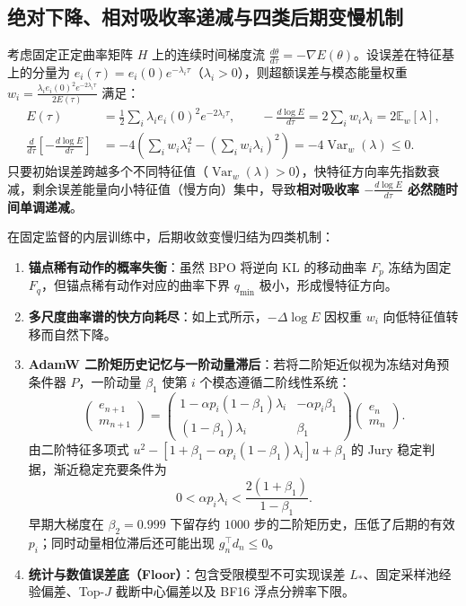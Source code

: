 \documentclass[lang=cn,scheme=chinese,openany]{elegantbook}
\newcommand{\E}{\mathbb E}
\newcommand{\Var}{\operatorname{Var}}
\begin{document}
\subsection{绝对下降、相对吸收率递减与四类后期变慢机制}

考虑固定正定曲率矩阵 $H$ 上的连续时间梯度流 $\frac{d\theta}{d\tau}=-\nabla E(\theta)$。设误差在特征基上的分量为 $e_i(\tau)=e_i(0)e^{-\lambda_i\tau}$（$\lambda_i>0$），则超额误差与模态能量权重 $w_i=\frac{\lambda_i e_i(0)^2 e^{-2\lambda_i\tau}}{2E(\tau)}$ 满足：
\begin{align}
E(\tau)&=\frac12\sum_i\lambda_i e_i(0)^2e^{-2\lambda_i\tau},\qquad
-\frac{d\log E}{d\tau}=2\sum_i w_i\lambda_i=2\E_w[\lambda],\\
\frac{d}{d\tau}\left[-\frac{d\log E}{d\tau}\right]
&=-4\left(\sum_i w_i\lambda_i^2-\left(\sum_i w_i\lambda_i\right)^2\right)
=-4\operatorname{Var}_w(\lambda)\le0.
\end{align}
只要初始误差跨越多个不同特征值（$\Var_w(\lambda)>0$），快特征方向率先指数衰减，剩余误差能量向小特征值（慢方向）集中，导致\textbf{相对吸收率 $-\frac{d\log E}{d\tau}$ 必然随时间单调递减}。

在固定监督的内层训练中，后期收敛变慢归结为四类机制：
\begin{enumerate}
\item \textbf{锚点稀有动作的概率失衡}：虽然 BPO 将逆向 KL 的移动曲率 $F_p$ 冻结为固定 $F_q$，但锚点稀有动作对应的曲率下界 $q_{\min}$ 极小，形成慢特征方向。
\item \textbf{多尺度曲率谱的快方向耗尽}：如上式所示，$-\Delta\log E$ 因权重 $w_i$ 向低特征值转移而自然下降。
\item \textbf{AdamW 二阶矩历史记忆与一阶动量滞后}：若将二阶矩近似视为冻结对角预条件器 $P$，一阶动量 $\beta_1$ 使第 $i$ 个模态遵循二阶线性系统：
\begin{equation}
\begin{pmatrix}e_{n+1}\\m_{n+1}\end{pmatrix}
=\begin{pmatrix}
1-\alpha p_i(1-\beta_1)\lambda_i&-\alpha p_i\beta_1\\
(1-\beta_1)\lambda_i&\beta_1
\end{pmatrix}
\begin{pmatrix}e_n\\m_n\end{pmatrix}.
\end{equation}
由二阶特征多项式 $u^2-[1+\beta_1-\alpha p_i(1-\beta_1)\lambda_i]u+\beta_1$ 的 Jury 稳定判据，渐近稳定充要条件为
\begin{equation*}
0<\alpha p_i\lambda_i<\frac{2(1+\beta_1)}{1-\beta_1}.
\end{equation*}
早期大梯度在 $\beta_2=0.999$ 下留存约 $1000$ 步的二阶矩历史，压低了后期的有效 $p_i$；同时动量相位滞后还可能出现 $g_n^\top d_n\le 0$。
\item \textbf{统计与数值误差底（Floor）}：包含受限模型不可实现误差 $L_*$、固定采样池经验偏差、Top-$J$ 截断中心偏差以及 BF16 浮点分辨率下限。
\end{enumerate}
\end{document}

